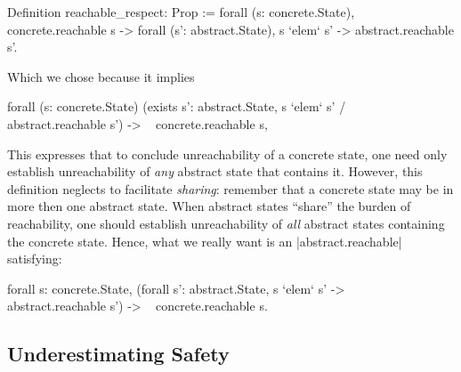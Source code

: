 \documentclass[runningheads]{llncs}
\newcommand{\weg}[1]{}
\begin{document}
\begin{code}
Definition reachable_respect: Prop :=
  forall (s: concrete.State), concrete.reachable s ->
    forall (s': abstract.State), s `elem` s' -> abstract.reachable s'.
\end{code}
Which we chose because it implies
\begin{code}
forall (s: concrete.State)
  (exists s': abstract.State, s `elem` s' /\ ~ abstract.reachable s') ->
    ~ concrete.reachable s,
\end{code}
This expresses that to conclude unreachability of a concrete state,
one need only establish unreachability of \emph{any} abstract state
that contains it. However, this definition neglects to facilitate {\em
  sharing}: remember that a concrete state may be in more then one
abstract state. When abstract states ``share'' the burden of
reachability, one should establish unreachability of \emph{all}
abstract states containing the concrete state. Hence, what we really
want is an |abstract.reachable| satisfying:
\begin{code}
forall s: concrete.State,
  (forall s': abstract.State, s `elem` s' -> ~ abstract.reachable s') ->
  ~ concrete.reachable s.
\end{code}
\weg{
This property follows from the following new definition of |reachable_respect| we will use:
\begin{code}
Definition reachable_respect: Prop :=
  shared_cover concrete.reachable abstract.reachable.
\end{code}
}

\subsection{Underestimating Safety}
\label{underestimatingsafety}

\end{document}
